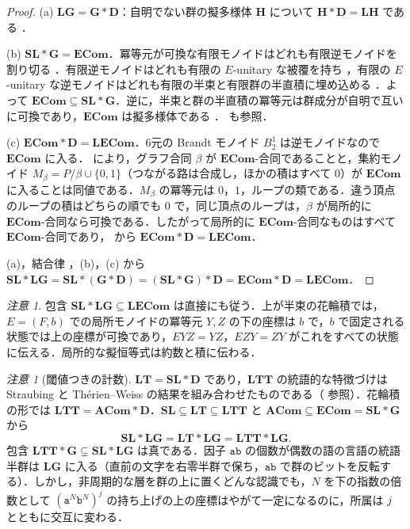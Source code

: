 \documentclass[11pt,a4paper]{ltjsarticle}
\numberwithin{equation}{section}
\theoremstyle{plain}
\theoremstyle{definition}
\theoremstyle{remark}
\newtheorem{remark}[theorem]{注意}
\theoremstyle{plain}
\newcommand{\LG}{\mathbf{LG}}
\newcommand{\SL}{\mathbf{SL}}
\newcommand{\Gp}{\mathbf{G}}
\newcommand{\Dd}{\mathbf{D}}
\newcommand{\ECom}{\mathbf{ECom}}
\newcommand{\LECom}{\mathbf{L}\mathbf{ECom}}
\newcommand{\LT}{\mathbf{LT}}
\newcommand{\LTT}{\mathbf{LTT}}
\newcommand{\ACom}{\mathbf{ACom}}
\begin{document}
\begin{proof}
(a) $\LG=\Gp*\Dd$：自明でない群の擬多様体 $\mathbf H$ について $\mathbf H*\Dd=\mathbf L\mathbf H$ である \cite[例1.3，定理2.8]{TherienWeiss1985}．

(b) $\SL*\Gp=\ECom$．冪等元が可換な有限モノイドはどれも有限逆モノイドを割り切る \cite{Ash1987}．有限逆モノイドはどれも有限の $E$-unitary な被覆を持ち \cite{McAlister1974}，有限の $E$-unitary な逆モノイドはどれも有限の半束と有限群の半直積に埋め込める \cite{OCarroll1976}．よって $\ECom\subseteq\SL*\Gp$．逆に，半束と群の半直積の冪等元は群成分が自明で互いに可換であり，$\ECom$ は擬多様体である \cite{Ash1987}．\cite{MargolisPin1987} も参照．

(c) $\ECom*\Dd=\LECom$．6元の Brandt モノイド $B_2^1$ は逆モノイドなので $\ECom$ に入る．\cite[定理1.5]{TherienWeiss1985} により，グラフ合同 $\beta$ が $\ECom$-合同であることと，集約モノイド $M_\beta=P/\beta\cup\{0,1\}$（つながる路は合成し，ほかの積はすべて $0$）が $\ECom$ に入ることは同値である．$M_\beta$ の冪等元は $0$，$1$，ループの類である．違う頂点のループの積はどちらの順でも $0$ で，同じ頂点のループは，$\beta$ が局所的に $\ECom$-合同なら可換である．したがって局所的に $\ECom$-合同なものはすべて $\ECom$-合同であり，\cite[定理2.8]{TherienWeiss1985} から $\ECom*\Dd=\LECom$．

(a)，結合律 \cite{Tilson1987}，(b)，(c) から
$\SL*\LG=\SL*(\Gp*\Dd)=(\SL*\Gp)*\Dd=\ECom*\Dd=\LECom$．
\end{proof}

\begin{remark}
包含 $\SL*\LG\subseteq\LECom$ は直接にも従う．上が半束の花輪積では，$E=(F,b)$ での局所モノイドの冪等元 $Y,Z$ の下の座標は $b$ で，$b$ で固定される状態では上の座標が可換であり，$EYZ=YZ$，$EZY=ZY$ がこれをすべての状態に伝える．局所的な擬恒等式は約数と積に伝わる．
\end{remark}

\begin{remark}[閾値つきの計数]
\label{rem:LTT}
$\LT=\SL*\Dd$ \cite{BrzozowskiSimon1973,McNaughton1974,Straubing1985} であり，$\LTT$ の統語的な特徴づけは Straubing \cite{Straubing1985} と Th\'erien--Weiss \cite{TherienWeiss1985} の結果を組み合わせたものである（\cite{BeauquierPin1991} 参照）．花輪積の形では $\LTT=\ACom*\Dd$．$\SL\subseteq\LT\subseteq\LTT$ と $\ACom\subseteq\ECom=\SL*\Gp$ から
\[
  \SL*\LG=\LT*\LG=\LTT*\LG .
\]
包含 $\LTT*\Gp\subsetneq\SL*\LG$ は真である．因子 $\mathtt{ab}$ の個数が偶数の語の言語の統語半群は $\LG$ に入る（直前の文字を右零半群で保ち，$\mathtt{ab}$ で群のビットを反転する）．しかし，非周期的な層を群の上に置くどんな認識でも，$N$ を下の指数の倍数として $(\mathtt a^N\mathtt b^N)^j$ の持ち上げの上の座標はやがて一定になるのに，所属は $j$ とともに交互に変わる．
\end{remark}
\end{document}
